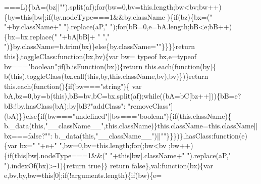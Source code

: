 \begin{DoxyCode}
      ===L)\{bA=(bz||\textcolor{stringliteral}{""}).split(af);\textcolor{keywordflow}{for}(bw=0,bv=this.length;bw<bv;bw++)\{by=\textcolor{keyword}{this}[bw];\textcolor{keywordflow}{if}(by.nodeType===1&&by.className
      )\{\textcolor{keywordflow}{if}(bz)\{bx=(\textcolor{stringliteral}{" "}+by.className+\textcolor{stringliteral}{" "}).replace(aP,\textcolor{stringliteral}{" "});\textcolor{keywordflow}{for}(bB=0,e=bA.length;bB<e;bB++)\{bx=bx.replace(\textcolor{stringliteral}{" "}+bA[bB]+\textcolor{stringliteral}{
      " "},\textcolor{stringliteral}{" "})\}by.className=b.trim(bx)\}\textcolor{keywordflow}{else}\{by.className=\textcolor{stringliteral}{""}\}\}\}\}\textcolor{keywordflow}{return} \textcolor{keyword}{this}\},toggleClass:\textcolor{keyword}{function}(bx,bv)\{var bw=
      typeof bx,e=typeof bv===\textcolor{stringliteral}{"boolean"};\textcolor{keywordflow}{if}(b.isFunction(bx))\{\textcolor{keywordflow}{return} this.each(\textcolor{keyword}{function}(by)\{
      b(\textcolor{keyword}{this}).toggleClass(bx.call(\textcolor{keyword}{this},by,\textcolor{keyword}{this}.className,bv),bv)\})\}\textcolor{keywordflow}{return} this.each(\textcolor{keyword}{function}()\{\textcolor{keywordflow}{if}(bw===\textcolor{stringliteral}{"string"})\{
      var bA,bz=0,by=b(\textcolor{keyword}{this}),bB=bv,bC=bx.split(af);\textcolor{keywordflow}{while}((bA=bC[bz++]))\{bB=e?bB:!by.hasClass(bA);by[bB?\textcolor{stringliteral}{"addClass"}:\textcolor{stringliteral}{
      "removeClass"}](bA)\}\}\textcolor{keywordflow}{else}\{\textcolor{keywordflow}{if}(bw===\textcolor{stringliteral}{"undefined"}||bw===\textcolor{stringliteral}{"boolean"})\{\textcolor{keywordflow}{if}(this.className)\{
      b.\_data(\textcolor{keyword}{this},\textcolor{stringliteral}{"\_\_className\_\_"},this.className)\}this.className=this.className||bx===\textcolor{keyword}{false}?\textcolor{stringliteral}{""}:
      b.\_data(\textcolor{keyword}{this},\textcolor{stringliteral}{"\_\_className\_\_"})||\textcolor{stringliteral}{""}\}\}\})\},hasClass:\textcolor{keyword}{function}(e)\{var bx=\textcolor{stringliteral}{" "}+e+\textcolor{stringliteral}{" "},bw=0,bv=this.length;\textcolor{keywordflow}{for}(;bw<bv
      ;bw++)\{\textcolor{keywordflow}{if}(\textcolor{keyword}{this}[bw].nodeType===1&&(\textcolor{stringliteral}{" "}+\textcolor{keyword}{this}[bw].className+\textcolor{stringliteral}{" "}).replace(aP,\textcolor{stringliteral}{" "}).indexOf(bx)>-1)\{\textcolor{keywordflow}{return} \textcolor{keyword}{true}\}\}\textcolor{keywordflow}{
      return} \textcolor{keyword}{false}\},val:\textcolor{keyword}{function}(bx)\{var e,bv,by,bw=\textcolor{keyword}{this}[0];\textcolor{keywordflow}{if}(!arguments.length)\{\textcolor{keywordflow}{if}(bw)\{e=

\end{DoxyCode}
